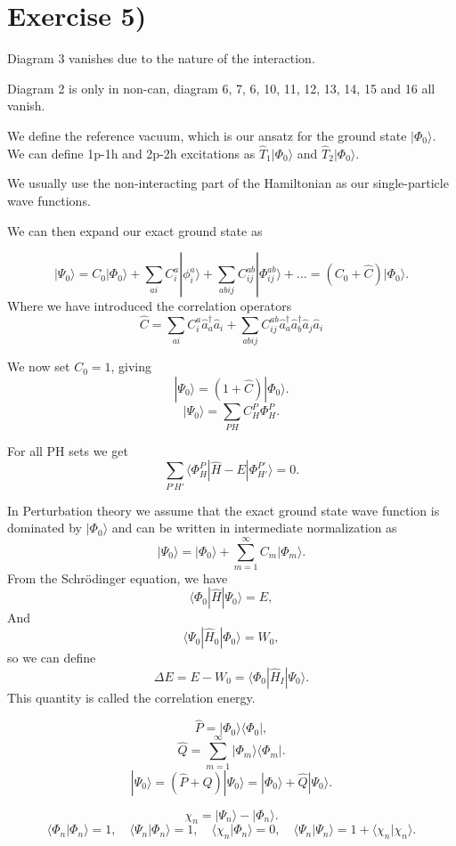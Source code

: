 \documentclass[a4paper, 11pt, notitlepage, english]{article}
\newcommand{\bra}[1]{\langle #1|}
\newcommand{\ket}[1]{|#1 \rangle}
\newcommand{\braket}[2]{\langle #1 | #2 \rangle}
\newcommand{\op}[1]{\hat{#1}}
\newcommand{\braopket}[3]{\langle #1 | {#2} | #3 \rangle}
\newcommand{\ketbra}[2]{\ket{#1}\bra{#2}}
\begin{document}
\section*{Exercise 5)}

Diagram 3 vanishes due to the nature of the interaction.

Diagram 2 is only in non-can, diagram 6, 7, 6, 10, 11, 12, 13, 14, 15 and 16 all vanish.


\clearpage

We define the reference vacuum, which is our ansatz for the ground state $\ket{\Phi_0}$. We can define 1p-1h and 2p-2h excitations as $\op{T}_1\ket{\Phi_0}$ and $\op{T}_2\ket{\Phi_0}$.

We usually use the non-interacting part of the Hamiltonian as our single-particle wave functions.

We can then expand our exact ground state as

$$\ket{\Psi_0} = C_0\ket{\Phi_0} + \sum_{ai}C_i^a \ket{\phi_i^a} + \sum_{abij}C_{ij}^{ab}\ket{\Phi_{ij}^{ab}} + \ldots = (C_0 + \op{C})\ket{\Phi_0}.$$
Where we have introduced the correlation operators
$$\op{C} = \sum_{ai}C_i^a \op{a}_{a}^\dagger \op{a}_i  + \sum_{abij}C_{ij}^{ab} \op{a}_{a}^\dagger \op{a}_{b}^\dagger \op{a}_j \op{a}_i $$

We now set $C_0 = 1$, giving
$$\ket{\Psi_0} = (1+\op{C})\ket{\Phi_0}.$$
$$\ket{\Psi_0} = \sum_{PH} C_{H}^P \Phi_H^P.$$

For all PH sets we get
$$\sum_{P'H'} \braopket{\Phi_H^P}{\op{H}-E}{\Phi_{H'}^{P'}} = 0.$$

In Perturbation theory we assume that the exact ground state wave function is dominated by $\ket{\Phi_0}$ and can be written in intermediate normalization as
$$\ket{\Psi_0} = \ket{\Phi_0} + \sum_{m=1}^\infty C_m \ket{\Phi_m}.$$
From the Schrödinger equation, we have
$$\braopket{\Phi_0}{\op{H}}{\Psi_0} = E,$$
And
$$\braopket{\Psi_0}{\op{H}_0}{\Phi_0} = W_0,$$
so we can define
$$\Delta E = E - W_0 = \braopket{\Phi_0}{\op{H}_I}{\Psi_0}.$$
This quantity is called the correlation energy.

$$\op{P} = \ketbra{\Phi_0}{\Phi_0},$$
$$\op{Q} = \sum_{m=1}^\infty \ketbra{\Phi_m}{\Phi_m}.$$
$$\ket{\Psi_0} = (\op{P} + \op{Q})\ket{\Psi_0} = \ket{\Phi_0} + \op{Q}\ket{\Psi_0}.$$

$$\chi_n = \ket{\Psi_n} - \ket{\Phi_n}.$$
$$\braket{\Phi_n}{\Phi_n} = 1, \quad \braket{\Psi_n}{\Phi_n} = 1, \quad \braket{\chi_n}{\Phi_n} = 0, \quad \braket{\Psi_n}{\Psi_n} = 1 + \braket{\chi_n}{\chi_n}.$$
\end{document}
